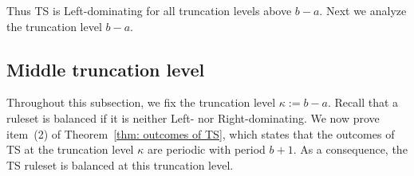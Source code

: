 \documentclass[oneside,reqno]{amsart}
\newcommand{\ts}{\mathcal{T}}
\newcommand{\np}{\mathscr{N}}
\newcommand{\pp}{\mathscr{P}}
\begin{document}
Thus {\sc TS} is Left-dominating for all truncation levels above $b-a$. Next we analyze the truncation level $b-a$.


\subsection{Middle truncation level}\label{subsec: balanced truncation level}
Throughout this subsection, we fix the truncation level $\kappa:=b-a$. 
Recall that a ruleset is balanced if it is neither Left- nor Right-dominating. %
We now prove item~(2) of Theorem~\ref{thm: outcomes of TS}, which states that the outcomes of {\sc TS} at the truncation level $\kappa$ are periodic with period $b+1$. As a consequence, the {\sc TS} ruleset is balanced at this truncation level. %
\end{document}
